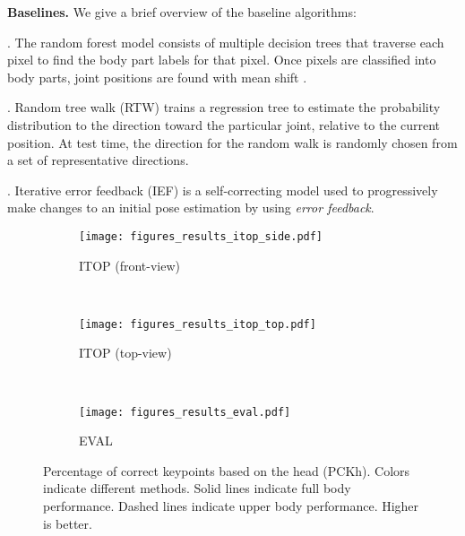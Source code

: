\documentclass[runningheads]{llncs}
\begin{document}
	\textbf{Baselines.} We give a brief overview of the baseline algorithms:

	. The random forest model \cite{shotton2011real} consists of multiple decision trees that traverse each pixel to find the body part labels for that pixel. Once pixels are classified into body parts, joint positions are found with mean shift \cite{comaniciu2002mean}.

	. Random tree walk (RTW) \cite{yub2015random} trains a regression tree to estimate the probability distribution to the direction toward the particular joint, relative to the current position. At test time, the direction for the random walk is randomly chosen from a set of representative directions.

	. Iterative error feedback (IEF) \cite{carreira2015human} is a self-correcting model used to progressively make changes to an initial pose estimation by using \textit{error feedback}.

	\begin{figure}[t]
		\centering
		\begin{subfigure}[b]{0.31\textwidth}
			\texttt{[image: figures\_results\_itop\_side.pdf]}
			\caption{ITOP (front-view)}
		\end{subfigure}
		~
		\begin{subfigure}[b]{0.31\textwidth}
			\texttt{[image: figures\_results\_itop\_top.pdf]}
			\caption{ITOP (top-view)}
		\end{subfigure}
		~
		\begin{subfigure}[b]{0.31\textwidth}
			\texttt{[image: figures\_results\_eval.pdf]}
			\caption{EVAL}
		\end{subfigure}
		\caption{Percentage of correct keypoints based on the head (PCKh). Colors indicate different methods. Solid lines indicate full body performance. Dashed lines indicate upper body performance. Higher is better.}
		\label{fig:pckh}
	\end{figure}
\end{document}
